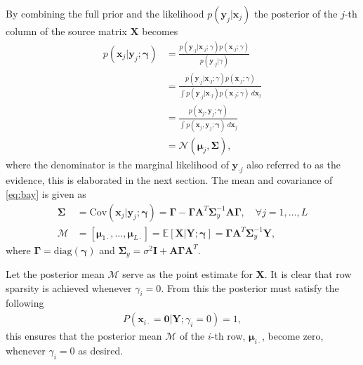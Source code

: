 By combining the full prior and the likelihood $p(\mathbf{y}_{j} \vert \mathbf{x}_{j})$ the posterior of the $j$-th column of the source matrix $\mathbf{X}$ becomes
\begin{align}
p(\mathbf{x}_{j} \vert \mathbf{y}_{j} ; \boldsymbol{\gamma}) &= \frac{p(\textbf{y}_{\cdot j} | \textbf{x}_{\cdot j};\gamma)p(\textbf{x}_{\cdot j};\gamma)}{p(\textbf{y}_{\cdot j}|\gamma)}
 \nonumber \\
&= \frac{p(\textbf{y}_{\cdot j} | \textbf{x}_{\cdot j};\gamma)p(\textbf{x}_{\cdot j};\gamma)}{\int p(\mathbf{y}_{\cdot j} | \mathbf{x}_{\cdot j})p(\mathbf{x}_{\cdot j};\gamma) \ d \mathbf{x}_{j}}
\nonumber \\ 
&= \frac{p(\mathbf{x}_{j}, \mathbf{y}_{j} ; \boldsymbol{\gamma})}{\int p(\mathbf{x}_{j}, \mathbf{y}_{j} ; \boldsymbol{\gamma}) \ d \mathbf{x}_{j}} \nonumber \\ 
&= \mathcal{N}(\boldsymbol{\mu}_{j}, \boldsymbol{\Sigma}),\label{eq:bay}
\end{align}
where the denominator is the marginal likelihood of $\textbf{y}_{\cdot j}$ also referred to as the evidence, this is elaborated in the next section. The mean and covariance of \eqref{eq:bay} is given as
\begin{align}
\boldsymbol{\Sigma} &= \text{Cov}(\mathbf{x}_{j} \vert \mathbf{y}_{j} ; \boldsymbol{\gamma}) = \boldsymbol{\Gamma} - \boldsymbol{\Gamma} \mathbf{A}^T \boldsymbol{\Sigma}_y^{-1} \mathbf{A} \boldsymbol{\Gamma}, \quad \forall j = 1, \dots, L \nonumber \\
\mathcal{M} &= [\boldsymbol{\mu}_{1 \cdot}, \dots, \boldsymbol{\mu}_{ L \cdot}] = \mathbb{E}[\mathbf{X} \vert \mathbf{Y} ; \boldsymbol{\gamma}] = \boldsymbol{\Gamma} \mathbf{A}^T \boldsymbol{\Sigma}_y^{-1} \mathbf{Y}, \label{eq:moments}
\end{align}
where $\boldsymbol{\Gamma} = \text{diag}(\boldsymbol{\gamma})$ and $\boldsymbol{\Sigma}_y = \sigma^2 \mathbf{I} + \mathbf{A} \boldsymbol{\Gamma} \mathbf{A}^T$. 

Let the posterior mean $\mathcal{M}$ serve as the point estimate for $\mathbf{X}$.
It is clear that row sparsity is achieved whenever $\gamma_i = 0$. 
From this the posterior must satisfy the following 
\begin{align*}
P(\mathbf{x}_{i \cdot} = \mathbf{0} \vert \mathbf{Y} ; \gamma_i = 0) = 1,
\end{align*}
this ensures that the posterior mean $\mathcal{M}$ of the $i$-th row, $\boldsymbol{\mu}_{i \cdot}$, become zero, whenever $\gamma_i = 0$ as desired.

